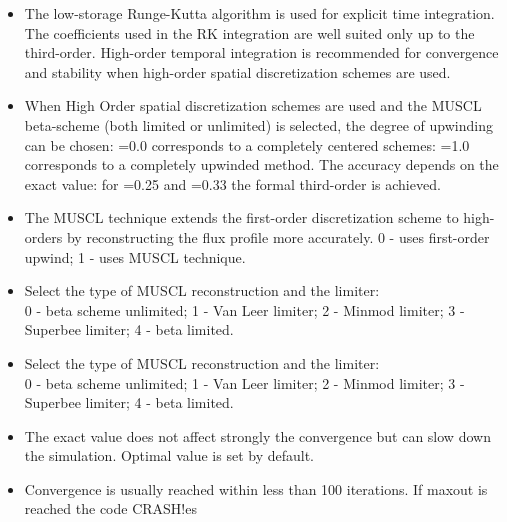 \begin{itemize}

\item
{}
{The low-storage Runge-Kutta algorithm is used for explicit time integration.
The coefficients used in the RK integration are well suited only up to the
third-order. High-order temporal integration is recommended for 
convergence and stability when high-order spatial discretization schemes 
are used.}

\item
{}
{When High Order spatial discretization schemes are used and the MUSCL 
beta-scheme (both limited or unlimited) is selected, the degree of upwinding
can be chosen: =0.0 corresponds to a completely centered schemes:
=1.0 corresponds to a completely upwinded method. The accuracy depends
on the exact value: for =0.25 and =0.33 the formal third-order
is achieved.}

\item
{}
{The MUSCL technique extends the first-order discretization
scheme to high-orders by reconstructing the flux profile more accurately.
0 - uses first-order upwind; 1 - uses MUSCL technique.}

\item
{}
{Select the type of MUSCL reconstruction and the limiter:\\
0 - beta scheme unlimited; 1 - Van Leer limiter; 2 - Minmod limiter;
3 - Superbee limiter; 4 - beta limited.}

\item
{}
{Select the type of MUSCL reconstruction and the limiter:\\
0 - beta scheme unlimited; 1 - Van Leer limiter; 2 - Minmod limiter;
3 - Superbee limiter; 4 - beta limited.}
\item
{}
{The exact value does not affect strongly the convergence but can slow down
the simulation. Optimal value is set by default.}

\item
{}
{Convergence is usually reached within less than 100 iterations. If maxout is reached the code CRASH!es}


\end{itemize}
